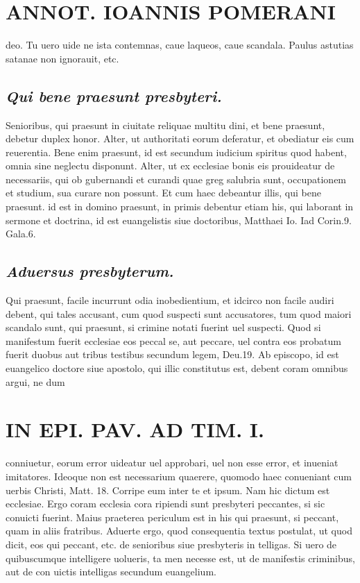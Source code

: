 \documentclass{article}
\begin{document}
\begin{pages}
\section*{ANNOT. IOANNIS POMERANI }\pstart deo. Tu uero uide ne ista contemnas, caue laqueos, caue scandala. Paulus astutias satanae non ignorauit, etc.  \pend
{}
{}
\subsection*{\textit{Qui bene praesunt presbyteri. }}\pstart Senioribus, qui praesunt in ciuitate reliquae multitu dini, et bene praesunt, debetur duplex honor. Alter, ut authoritati eorum deferatur, et obediatur eis cum reuerentia. Bene enim praesunt, id est secundum iudicium spiritus quod habent, omnia sine neglectu disponunt. Alter, ut ex ecclesiae bonis eis prouideatur de necessariis, qui ob gubernandi et curandi quae greg salubria sunt, occupationem et studium, sua curare non possunt. Et cum haec debeantur illis, qui bene praesunt. id est in domino praesunt, in primis debentur etiam his, qui laborant in sermone et doctrina, id est euangelistis siue doctoribus, Matthaei Io. Iad Corin.9. Gala.6.  \pend
{}
{}
\subsection*{\textit{Aduersus presbyterum. }}\pstart Qui praesunt, facile incurrunt odia inobedientium, et idcirco non facile audiri debent, qui tales accusant, cum quod suspecti sunt accusatores, tum quod maiori scandalo sunt, qui praesunt, si crimine notati fuerint uel suspecti. Quod si manifestum fuerit ecclesiae eos peccal se, aut peccare, uel contra eos probatum fuerit duobus aut tribus testibus secundum legem, Deu.19. Ab episcopo, id est euangelico doctore siue apostolo, qui illic constitutus est, debent coram omnibus argui, ne dum  \pend
\section*{IN EPI. PAV. AD TIM. I. }
\marginpar{[ p.96 ]}\pstart conniuetur, eorum error uideatur uel approbari, uel non esse error, et inueniat imitatores. Ideoque non est necessarium quaerere, quomodo haec conueniant cum uerbis Christi, Matt. 18. Corripe eum inter te et ipsum. Nam hic dictum est ecclesiae. Ergo coram ecclesia cora ripiendi sunt presbyteri peccantes, si sic conuicti fuerint. Maius praeterea periculum est in his qui praesunt, si peccant, quam in aliis fratribus. Aduerte ergo, quod consequentia textus postulat, ut quod dicit, eos qui peccant, etc. de senioribus siue presbyteris in telligas. Si uero de quibuscumque intelligere uolueris, ta men necesse est, ut de manifestis criminibus, aut de con uictis intelligas secundum euangelium.  \pend
{}
{}

\end{pages}
\end{document}
